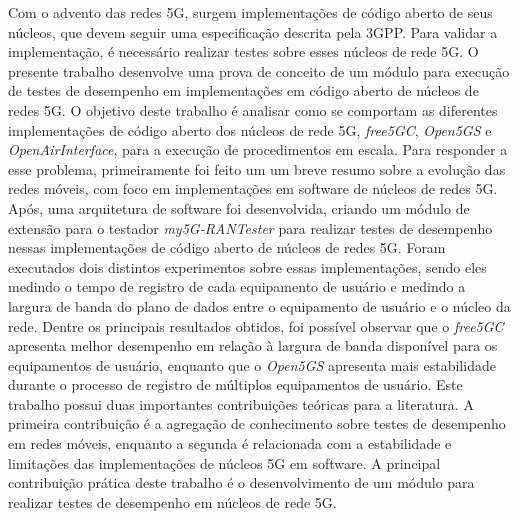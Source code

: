 Com o advento das redes 5G, surgem implementações de código aberto de seus núcleos, que devem seguir uma especificação descrita pela 3GPP.
Para validar a implementação, é necessário realizar testes sobre esses núcleos de rede 5G.
O presente trabalho desenvolve uma prova de conceito de um módulo para execução de testes de desempenho em implementações em código aberto de núcleos de redes 5G.
O objetivo deste trabalho é analisar como se comportam as diferentes implementações de código aberto dos núcleos de rede 5G, \textit{free5GC}, \textit{Open5GS} e \textit{OpenAirInterface}, para a execução de procedimentos em escala.
Para responder a esse problema, primeiramente foi feito um um breve resumo sobre a evolução das redes móveis, com foco em implementações em software de núcleos de redes 5G.
Após, uma arquitetura de software foi desenvolvida, criando um módulo de extensão para o testador \textit{my5G-RANTester} para realizar testes de desempenho nessas implementações de código aberto de núcleos de redes 5G.
Foram executados dois distintos experimentos sobre essas implementações, sendo eles medindo o tempo de registro de cada equipamento de usuário e medindo a largura de banda do plano de dados entre o equipamento de usuário e o núcleo da rede.
Dentre os principais resultados obtidos, foi possível observar que o \textit{free5GC} apresenta melhor desempenho em relação à largura de banda disponível para os equipamentos de usuário, enquanto que o \textit{Open5GS} apresenta mais estabilidade durante o processo de registro de múltiplos equipamentos de usuário.
Este trabalho possui duas importantes contribuições teóricas para a literatura. A primeira contribuição é a agregação de conhecimento sobre testes de desempenho em redes móveis, enquanto a segunda é relacionada com a estabilidade e limitações das implementações de núcleos 5G em software.
A principal contribuição prática deste trabalho é o desenvolvimento de um módulo para realizar testes de desempenho em núcleos de rede 5G.
